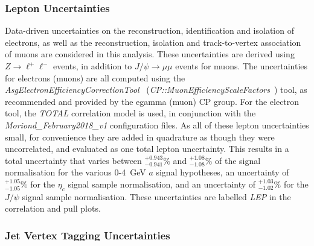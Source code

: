 \documentclass[NOTE, atlasdraft=true, texlive=2017, UKenglish]{\ATLASLATEXPATH atlasdoc}
\begin{document}


\subsubsection{Lepton Uncertainties}
\label{sec:syslep}

Data-driven uncertainties on the reconstruction, identification and isolation of electrons, as well as the reconstruction, isolation and track-to-vertex association of muons are considered in this analysis. These uncertainties are derived using $Z\to \ell^+\ell^-$ events, in addition to $J/\psi\to \mu\mu$ events for muons. The uncertainties for electrons (muons) are all computed using the \emph{AsgElectronEfficiencyCorrectionTool}~\cite{AsgElectronEfficiencyCorrectionTool} (\emph{CP::MuonEfficiencyScaleFactors}~\cite{MuonEfficiencyScaleFactors}) tool, as recommended and provided by the egamma (muon) CP group. For the electron tool, the \emph{TOTAL} correlation model is used, in conjunction with the \emph{Moriond\_February2018\_v1} configuration files. As all of these lepton uncertainties small, for convenience they are added in quadrature as though they were uncorrelated, and evaluated as one total lepton uncertainty. This results in a total uncertainty that varies between $^{+0.943}_{-0.941}\%$ and $^{+1.08}_{-1.08}\%$ of the signal normalisation for the various 0-4~GeV $a$ signal hypotheses, an uncertainty of $^{+1.05}_{-1.05}\%$ for the $\eta_c$ signal sample normalisation, and an uncertainty of $^{+1.03}_{-1.02}\%$ for the $J/\psi$ signal sample normalisation. These uncertainties are labelled \emph{LEP} in the correlation and pull plots.%


\subsubsection{Jet Vertex Tagging Uncertainties}
\label{sec:sysjvt}
\end{document}
